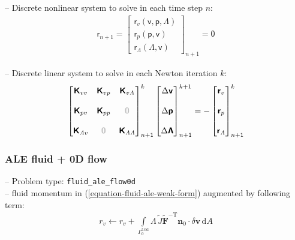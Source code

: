 \documentclass[a4paper,12pt]{report}
\newcommand{\fF}{\text{f}}
\newcommand{\bs}[1]{\boldsymbol{#1}}
\newcommand{\Gm}{\mathit{\Gamma}}
\newcommand{\zerom}{\textcolor{lightgray}{\bs{\mathsf{0}}}}
\newcommand{\ROP}{\bs{\mathsf{r}}}
\newcommand{\LMZ}{\bs{\mathsf{\Lambda}}}
\newcommand{\lmzi}{\mathit{\Lambda}} %
\begin{document}
-- Discrete nonlinear system to solve in each time step $n$:
\begin{equation}
\label{equation-nonlin-sys-fluid-0d}
\begin{aligned}
\ROP_{n+1} = \begin{bmatrix} \ROP_{v}(\bs{\mathsf{v}},\bs{\mathsf{p}},\LMZ) \\ \ROP_{p}(\bs{\mathsf{p}},\bs{\mathsf{v}}) \\ \ROP_{\mathit{\Lambda}}(\LMZ,\bs{\mathsf{v}}) \end{bmatrix}_{n+1} = \bs{\mathsf{0}}
\end{aligned}
\end{equation}

-- Discrete linear system to solve in each Newton iteration $k$:
\begin{equation}
\label{equation-lin-sys-fluid-0d}
\begin{aligned}
\begin{bmatrix} \bs{\mathsf{K}}_{vv} & \bs{\mathsf{K}}_{vp} & \bs{\mathsf{K}}_{v\lmzi} \\ \\ \bs{\mathsf{K}}_{pv} & \bs{\mathsf{K}}_{pp} & \zerom \\ \\  \bs{\mathsf{K}}_{\lmzi v} & \zerom & \bs{\mathsf{K}}_{\lmzi\lmzi}\end{bmatrix}_{n+1}^{k}\begin{bmatrix} \Delta\bs{\mathsf{v}} \\ \\ \Delta\bs{\mathsf{p}} \\ \\ \Delta\LMZ \end{bmatrix}_{n+1}^{k+1}=-\begin{bmatrix} \ROP_{v} \\ \\ \ROP_{p} \\ \\ \ROP_{\lmzi}\end{bmatrix}_{n+1}^{k}
\end{aligned}
\end{equation}

\subsubsection{ALE fluid + 0D flow}\label{ale-fluid-0d-flow}
-- Problem type: \verb"fluid_ale_flow0d"\\

-- fluid momentum in (\ref{equation-fluid-ale-weak-form}) augmented by following term:
\begin{equation}
\begin{aligned}
r_v \leftarrow r_v + \int\limits_{\Gm_0^{\fF\text{-}\mathrm{0d}}}\!\mathit{\Lambda}\,\widetilde{J}\widetilde{\bs{F}}^{-\mathrm{T}}\bs{n}_{0}\cdot\delta\bs{v}\,\mathrm{d}A
\end{aligned}
\end{equation}
\end{document}
